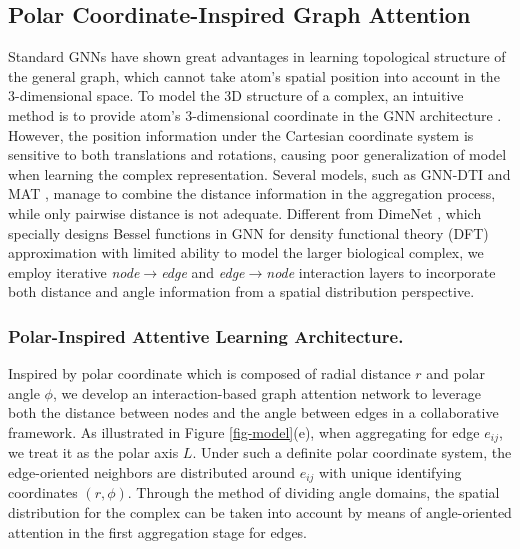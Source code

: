 \documentclass[sigconf]{acmart}
\begin{document}
\subsection{Polar Coordinate-Inspired Graph Attention}

Standard GNNs have shown great advantages in learning topological structure of the general graph, which cannot take atom's spatial position into account in the 3-dimensional space. To model the 3D structure of a complex, an intuitive method is to provide atom's 3-dimensional coordinate in the GNN architecture \cite{danel2020spatial}. However, the position information under the Cartesian coordinate system is sensitive to both translations and rotations, causing poor generalization of model when learning the complex representation. Several models, such as GNN-DTI \cite{klicpera_dimenet_2020} and MAT \cite{maziarka2020molecule}, manage to combine the distance information in the aggregation process, while only pairwise distance is not adequate. Different from DimeNet \cite{klicpera_dimenet_2020}, which specially designs Bessel functions in GNN for density functional theory (DFT) approximation with limited ability to model the larger biological complex, we employ iterative \textit{node$\rightarrow$edge} and \textit{edge$\rightarrow$node} interaction layers to incorporate both distance and angle information from a spatial distribution perspective.

\subsubsection{Polar-Inspired Attentive Learning Architecture.}
\label{subsec-embed}
Inspired by polar coordinate which is composed of radial distance $r$ and polar angle $\phi$, we develop an interaction-based graph attention network to leverage both the distance between nodes and the angle between edges in a collaborative framework. As illustrated in Figure \ref{fig-model}(e)\hide{\ref{fig-angle}}, when aggregating for edge $e_{ij}$, we treat it as the polar axis $L$. Under such a definite polar coordinate system, the edge-oriented neighbors are distributed around $e_{ij}$ with unique identifying coordinates $(r, \phi)$. Through the method of dividing angle domains, the spatial distribution for the complex can be taken into account by means of angle-oriented attention in the first aggregation stage for edges.
\end{document}
